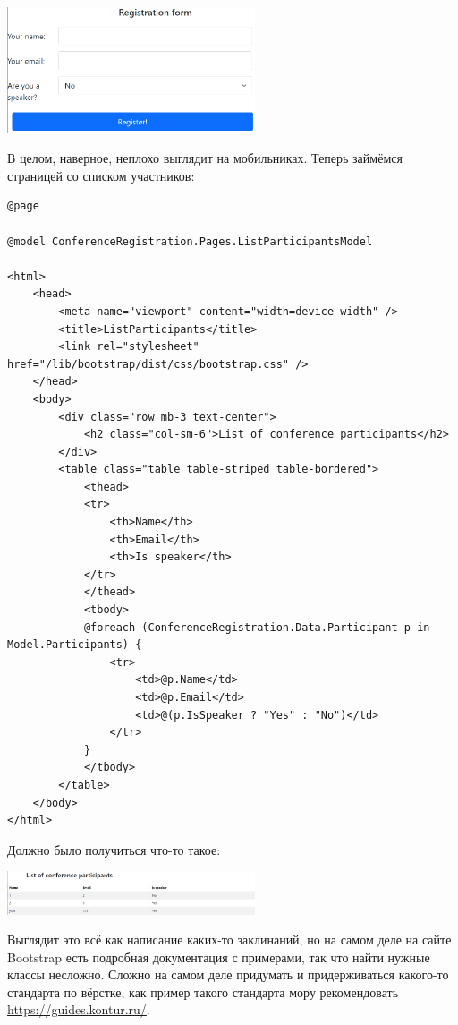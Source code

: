 \documentclass{../../text-style}
\begin{document}
\begin{center}
    \includegraphics[width=0.55\textwidth]{styledRegisterForm.png}
\end{center}

В целом, наверное, неплохо выглядит на мобильниках. Теперь займёмся страницей со списком участников:

\begin{verbatim}
@page

@model ConferenceRegistration.Pages.ListParticipantsModel

<html>
    <head>
        <meta name="viewport" content="width=device-width" />
        <title>ListParticipants</title>
        <link rel="stylesheet" href="/lib/bootstrap/dist/css/bootstrap.css" />
    </head>
    <body>
        <div class="row mb-3 text-center">
            <h2 class="col-sm-6">List of conference participants</h2>
        </div>
        <table class="table table-striped table-bordered">
            <thead>
            <tr>
                <th>Name</th>
                <th>Email</th>
                <th>Is speaker</th>
            </tr>
            </thead>
            <tbody>
            @foreach (ConferenceRegistration.Data.Participant p in Model.Participants) {
                <tr>
                    <td>@p.Name</td>
                    <td>@p.Email</td>
                    <td>@(p.IsSpeaker ? "Yes" : "No")</td>
                </tr>
            }
            </tbody>
        </table>
    </body>
</html>
\end{verbatim}

Должно было получиться что-то такое:

\begin{center}
    \includegraphics[width=0.55\textwidth]{styledListParticipants.png}
\end{center}

Выглядит это всё как написание каких-то заклинаний, но на самом деле на сайте Bootstrap есть подробная документация с примерами, так что найти нужные классы несложно. Сложно на самом деле придумать и придерживаться какого-то стандарта по вёрстке, как пример такого стандарта мору рекомендовать \url{https://guides.kontur.ru/}.
\end{document}
